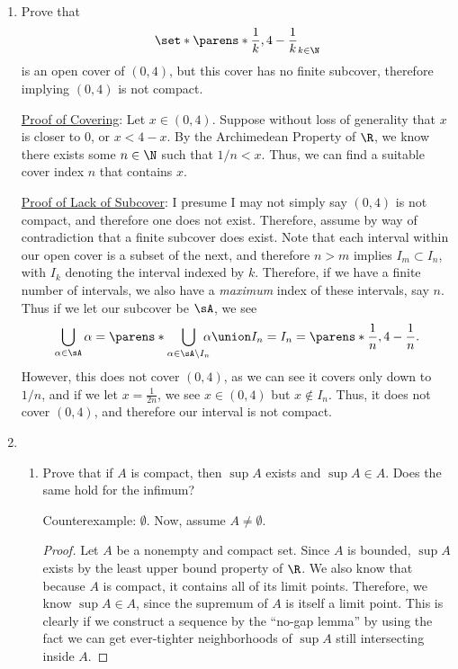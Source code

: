 \documentclass{article}
\begin{document}
\begin{enumerate}
  \item Prove that
        \[ \set*{\parens*{\frac{1}{k}, 4 - \frac{1}{k}}}_{k \in \N} \]
        is an open cover of $(0, 4)$, but this cover has no finite subcover, therefore implying $(0, 4)$ is not compact.

        \underline{Proof of Covering}:
        Let $x \in (0, 4)$. Suppose without loss of generality that $x$ is closer to 0, or $x < 4 - x$.
        By the Archimedean Property of $\R$, we know there exists some $n \in \N$
        such that $1/n < x$. Thus, we can find a suitable cover index $n$ that contains $x$.

        \underline{Proof of Lack of Subcover}:
        I presume I may not simply say $(0, 4)$ is not compact, and therefore one does not exist.
        Therefore, assume by way of contradiction that a finite subcover does exist. Note that each interval
        within our open cover is a subset of the next, and therefore $n > m$ implies $I_{m} \subset I_{n}$, with $I_{k}$
        denoting the interval indexed by $k$. Therefore, if we have a finite number of intervals, we also have a \emph{maximum}
        index of these intervals, say $n$. Thus if we let our subcover be $\sA$, we see
        \[ \bigcup_{\alpha \in \sA}\alpha = \parens*{\bigcup_{\alpha \in \sA \setminus I_{n}}\hspace{-0.25cm}\alpha} \union I_{n} = I_{n} = \parens*{\frac{1}{n}, 4 - \frac{1}{n}}. \]
        However, this does not cover $(0, 4)$, as we can see it covers only down to $1/n$, and if we let $x = \frac{1}{2n}$, we see
        $x \in (0, 4)$ but $x \notin I_{n}$. Thus, it does not cover $(0, 4)$, and therefore our interval is not compact.

  \item \begin{enumerate}

          \item Prove that if $A$ is compact, then $\sup A$ exists and $\sup A \in A$. Does the same hold for the infimum?

                Counterexample: $\emptyset$. Now, assume $A \ne \emptyset$.
                \begin{proof}
                  Let $A$ be a nonempty and compact set. Since $A$ is bounded, $\sup A$ exists by the least upper bound
                  property of $\R$. We also know that because $A$ is compact, it contains all of its limit points.
                  Therefore, we know $\sup A \in A$, since the supremum of $A$ is itself a limit point. This is clearly if we
                  construct a sequence by the ``no-gap lemma'' by using the fact we can get ever-tighter neighborhoods of $\sup A$ still
                  intersecting inside $A$.
                \end{proof}



\end{enumerate}
\end{enumerate}
\end{document}
